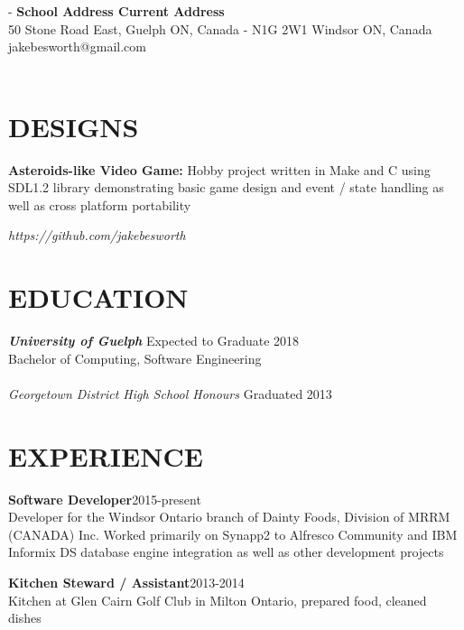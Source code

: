 \documentclass[line, margin]{res}
\begin{document}
\begin{resume}
\section{}
 -\sectionwidth \resumewidth
{
	\small{\textbf{School Address \hfill Current Address}}\\}
	{\color{darkgrey}\small {50 Stone Road East, Guelph ON, Canada -  N1G 2W1} \hfill {Windsor ON, Canada}\\}
	{\color{darkgrey}\small{} \hfill {jakebesworth@gmail.com\\\\}
}
\section{DESIGNS}
{
	\textbf{Asteroids-like Video Game: }{\color{darkgrey}Hobby project written in Make and C using SDL1.2 library demonstrating basic game design and event / state handling as well as cross platform portability}

	\textit{https://github.com/jakebesworth\\}
}

\section{EDUCATION}
{
	\textit{\textbf{University of Guelph}}\color{darkgrey} \hfill Expected to Graduate 2018\\
	Bachelor of Computing, Software Engineering\\\\
	\textit{Georgetown District High School Honours} \hfill Graduated 2013\\
}

\section{EXPERIENCE}
{
	\textbf{Software Developer}{\color{darkgrey}\hfill 2015-present \\[3pt]
	Developer for the Windsor Ontario branch of Dainty Foods, Division of MRRM (CANADA) Inc. Worked primarily on Synapp2 to Alfresco Community and IBM Informix DS database engine integration as well as other development projects}

	\textbf{Kitchen Steward / Assistant}{\color{darkgrey}\hfill 2013-2014 \\[3pt]
	Kitchen at Glen Cairn Golf Club in Milton Ontario, prepared food, cleaned dishes}

}
\end{resume}
\end{document}
